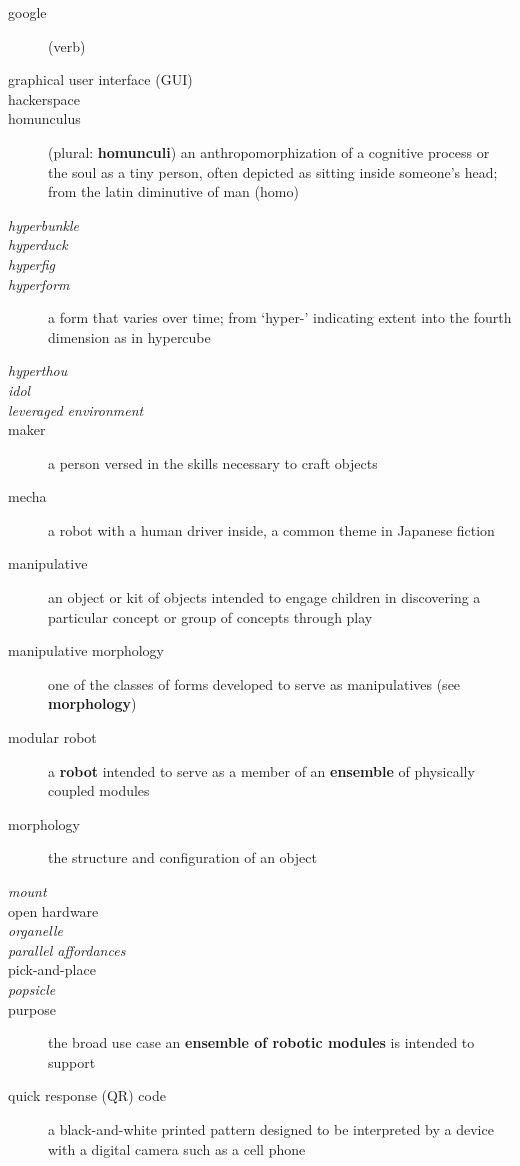 \begin{description}
%
\item[google] (verb)
%
\item[graphical user interface (GUI)]
%
\item[hackerspace]
%
\item[homunculus] (plural: {\bf homunculi}) an anthropomorphization of a cognitive process or the soul as a tiny person, often depicted as sitting inside someone's head; from the latin diminutive of man (homo)
%
\item[\emph{hyperbunkle}]
%
\item[\emph{hyperduck}]
%
\item[\emph{hyperfig}]
%
\item[\emph{hyperform}] a form that varies over time; from `hyper-' indicating extent into the fourth dimension as in hypercube
%
\item[\emph{hyperthou}]
%
\item[\emph{idol}]
%
\item[\emph{leveraged environment}]
%
\item[maker] a person versed in the skills necessary to craft objects
%
\item[mecha] a robot with a human driver inside, a common theme in Japanese fiction
%
\item[manipulative] an object or kit of objects intended to engage children in discovering a particular concept or group of concepts through play
%
\item[manipulative morphology] one of the classes of forms developed to serve as manipulatives (see {\bf morphology})
%
\item[modular robot] a {\bf robot} intended to serve as a member of an {\bf ensemble} of physically coupled modules
%
\item[morphology] the structure and configuration of an object
%
\item[\emph{mount}]
%
\item[open hardware]
%
\item[\emph{organelle}]
%
\item[\emph{parallel affordances}]
%
\item[pick-and-place]
%
\item[\emph{popsicle}]
%
\item[purpose] the broad use case an {\bf ensemble of robotic modules} is intended to support
%
\item[quick response (QR) code] a black-and-white printed pattern designed to be interpreted by a device with a digital camera such as a cell phone

\end{description}
